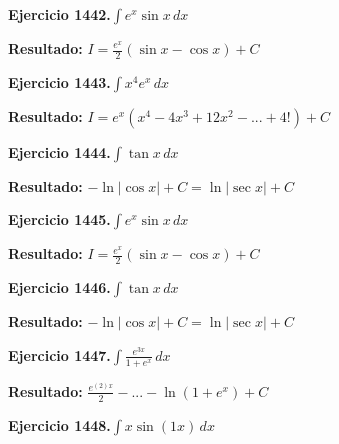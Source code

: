 \documentclass[10pt,a4paper]{article}
\begin{document}
\begin{ejbox}
\textbf{Ejercicio 1442.}\quad $\int e^x\sin x\,dx$
\end{ejbox}

\begin{solbox}
\textbf{Resultado:} \(\displaystyle I = \frac{e^x}{2}(\sin x - \cos x) + C\)
\end{solbox}

\begin{ejbox}
\textbf{Ejercicio 1443.}\quad $\int x^{4} e^x\,dx$
\end{ejbox}

\begin{solbox}
\textbf{Resultado:} \(\displaystyle I = e^x(x^{4} - 4x^{3} + 12x^{2} - ... + 4!) + C\)
\end{solbox}

\newpage
\begin{ejbox}
\textbf{Ejercicio 1444.}\quad $\int \tan x\,dx$
\end{ejbox}

\begin{solbox}
\textbf{Resultado:} \(\displaystyle -\ln|\cos x| + C = \ln|\sec x| + C\)
\end{solbox}

\begin{ejbox}
\textbf{Ejercicio 1445.}\quad $\int e^x\sin x\,dx$
\end{ejbox}

\begin{solbox}
\textbf{Resultado:} \(\displaystyle I = \frac{e^x}{2}(\sin x - \cos x) + C\)
\end{solbox}

\begin{ejbox}
\textbf{Ejercicio 1446.}\quad $\int \tan x\,dx$
\end{ejbox}

\begin{solbox}
\textbf{Resultado:} \(\displaystyle -\ln|\cos x| + C = \ln|\sec x| + C\)
\end{solbox}

\newpage
\begin{ejbox}
\textbf{Ejercicio 1447.}\quad $\int \frac{e^{3x}}{1+e^{x}}\,dx$
\end{ejbox}

\begin{solbox}
\textbf{Resultado:} \(\displaystyle \frac{e^{(2)x}}{2} - ... - \ln(1+e^x) + C\)
\end{solbox}

\begin{ejbox}
\textbf{Ejercicio 1448.}\quad $\int x \sin(1x)\,dx$
\end{ejbox}
\end{document}
